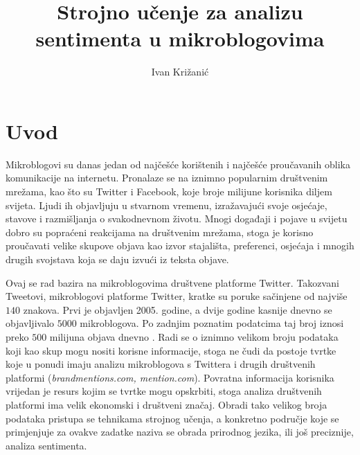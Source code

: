 \documentclass[times, utf8, zavrsni]{fer}
\begin{document}

\title{Strojno učenje za analizu sentimenta u mikroblogovima}

\author{Ivan Križanić}

\maketitle

\izvornik


\tableofcontents

\chapter{Uvod}


Mikroblogovi su danas jedan od najčešće korištenih i najčešće proučavanih oblika komunikacije na internetu. Pronalaze se na iznimno popularnim društvenim mrežama, kao što su Twitter i Facebook, koje broje milijune korisnika diljem svijeta. Ljudi ih objavljuju u stvarnom vremenu, izražavajući svoje osjećaje, stavove i razmišljanja o svakodnevnom životu. Mnogi događaji i pojave u svijetu dobro su popraćeni reakcijama na društvenim mrežama, stoga je korisno proučavati velike skupove objava kao izvor stajališta, preferenci, osjećaja i mnogih drugih svojstava koja se daju izvući iz teksta objave. 

Ovaj se rad bazira na mikroblogovima društvene platforme Twitter. Takozvani Tweetovi, mikroblogovi platforme Twitter, kratke su poruke sačinjene od najviše $140$ znakova. Prvi je objavljen 2005. godine, a dvije godine kasnije dnevno se objavljivalo $5000$ mikroblogova. Po zadnjim poznatim podatcima taj broj iznosi preko $500$ milijuna objava dnevno \citep{twitterStats}. Radi se o iznimno velikom broju podataka koji kao skup mogu nositi korisne informacije, stoga ne čudi da postoje tvrtke koje u ponudi imaju analizu mikroblogova s Twittera i drugih društvenih platformi (\textit{brandmentions.com, mention.com}). Povratna informacija korisnika vrijedan je resurs kojim se tvrtke mogu opskrbiti, stoga analiza društvenih platformi ima velik ekonomski i društveni značaj. Obradi tako velikog broja podataka pristupa se tehnikama strojnog učenja, a konkretno područje koje se primjenjuje za ovakve zadatke naziva se obrada prirodnog jezika, ili još preciznije, analiza sentimenta. 
\end{document}

